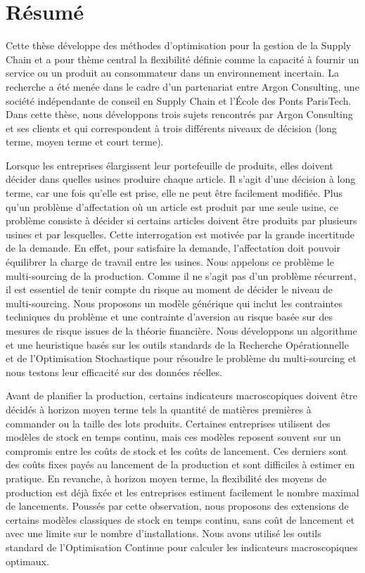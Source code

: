 \chapter*{R\'esum\'e} %
\label{cha:resume}


Cette thèse développe des méthodes d'optimisation pour la gestion de la Supply Chain et a pour thème central la flexibilité définie comme la capacité à fournir un service ou un produit au consommateur dans un environnement incertain.
La recherche a été menée dans le cadre d'un partenariat entre Argon Consulting, une société indépendante de conseil en Supply Chain et l'\'Ecole des Ponts ParisTech.
Dans cette thèse, nous développons trois sujets rencontrés par Argon Consulting et ses clients et qui correspondent à trois différents niveaux de décision (long terme, moyen terme et court terme).


Lorsque les entreprises élargissent leur portefeuille de produits, elles doivent décider dans quelles usines produire chaque article.
Il s'agit d'une décision à long terme, car une fois qu'elle est prise, elle ne peut être facilement modifiée.
Plus qu'un problème d'affectation où un article est produit par une seule usine, ce problème consiste à décider si certains articles doivent être produits par plusieurs usines et par lesquelles.
Cette interrogation est motivée par la grande incertitude de la demande.
En effet, pour satisfaire la demande, l'affectation doit pouvoir équilibrer la charge de travail entre les usines.
Nous appelons ce problème le multi-sourcing de la production.
Comme il ne s'agit pas d'un problème récurrent, il est essentiel de tenir compte du risque au moment de décider le niveau de multi-sourcing.
Nous proposons un modèle générique qui inclut les contraintes techniques du problème et une contrainte d'aversion au risque basée sur des mesures de risque issues de la théorie financière.
Nous développons un algorithme et une heuristique basés sur les outils standards de la Recherche Opérationnelle et de l'Optimisation Stochastique pour résoudre le problème du multi-sourcing et nous testons leur efficacité sur des données réelles.


Avant de planifier la production, certains indicateurs macroscopiques doivent être décidés à horizon moyen terme tels la quantité de matières premières à commander ou la taille des lots produits.
Certaines entreprises utilisent des modèles de stock en temps continu, mais ces modèles reposent souvent sur un compromis entre les coûts de stock et les coûts de lancement.
Ces derniers sont des coûts fixes payés au lancement de la production et sont difficiles à estimer en pratique.
En revanche, à horizon moyen terme, la flexibilité des moyens de production est déjà fixée et les entreprises estiment facilement le nombre maximal de lancements.
Poussés par cette observation, nous proposons des extensions de certains modèles classiques de stock en temps continu, sans coût de lancement et avec une limite sur le nombre d'installations.
Nous avons utilisé les outils standard de l'Optimisation Continue pour calculer les indicateurs macroscopiques optimaux.


